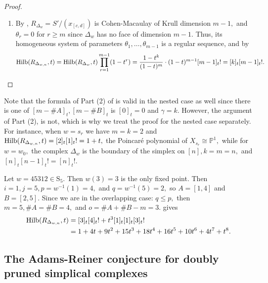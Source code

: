 \begin{proof}
\begin{enumerate}
        \item By , $R_{\Delta_w} = S'/(x_{[c,d]})$ is Cohen-Macaulay of Krull dimension $m - 1,$ and $\theta_r = 0$ for $r\geq m$ since $\Delta_w$ has no face of dimension $m - 1.$ Thus, its homogeneous system of parameters $\theta_1,\ldots,\theta_{m-1}$ is a regular sequence, and by  
        \[
        \mathrm{Hilb}(R_{\Delta_{w,n}},t) = \mathrm{Hilb}(R_{\Delta_w},t)\prod_{r=1}^{m-1}(1-t^r) = \frac{1-t^k}{(1-t)^m}\cdot(1-t)^{m-1}[m-1]_t! = [k]_t[m-1]_t!.
        \]
    \end{enumerate}
\end{proof}

Note that the formula of Part (2) of  is valid in the nested case as well since there is one of $[m-\#A]_t,[m-\#B]_t$ is $[0]_t = 0$ and $\gamma = k.$ However, the argument of Part (2), is not, which is why we treat the proof for the nested case separately. For instance, when $w = s_r$ we have $m = k = 2$ and $\mathrm{Hilb}(R_{\Delta_{w,n}},t) = [2]_t[1]_t! = 1 + t,$ the Poincar{\'e} polynomial of $X_{s_r} \cong \mathbb{P}^1,$ while for $w = w_0,$ the complex $\Delta_w$ is the boundary of the simplex on $[n], k = m = n,$ and $[n]_t[n-1]_t! = [n]_t!.$

\begin{example}
    Let $w = 45312\in\mathrm{S}_5.$ Then $w(3) = 3$ is the only fixed point. Then $i = 1, j = 5, p = w^{-1}(1) = 4,$ and $q = w^{-1}(5) = 2,$ so $A = [1,4]$ and $B = [2,5].$ 
    Since we are in the overlapping case: $q\leq p,$ then $ m = 5,\#A = \#B = 4,$ and $o = \#A + \#B - m = 3.$  gives
    \begin{align*}
        \mathrm{Hilb}(R_{\Delta_{w,n}},t) 
        & = [3]_t[4]_t! + t^3[1]_t[1]_t[3]_t! \\
        & = 1 + 4t + 9t^2 + 15t^3 + 18t^4 + 16t^5 + 10t^6 + 4t^7 + t^8.
    \end{align*}
\end{example}

\subsection{The Adams-Reiner conjecture for doubly pruned simplical complexes}

